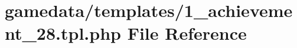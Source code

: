 \hypertarget{1__achievement__28_8tpl_8php}{\section{gamedata/templates/1\+\_\+achievement\+\_\+28.tpl.\+php File Reference}
\label{1__achievement__28_8tpl_8php}
}

